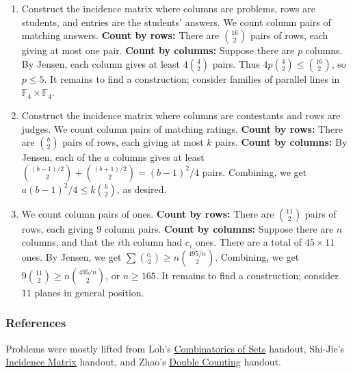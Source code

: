 \documentclass[11pt,paper=letter]{scrartcl}
\newcommand{\cbyrows}{{\bfseries \color{RowBlue} Count by rows: }}
\newcommand{\cbycols}{{\bfseries \color{ColOrange} Count by columns: }}
\begin{document}
\begin{enumerate}
\item Construct the incidence matrix where columns are problems, rows are students, and entries are the students' answers. We count column pairs of matching answers. \cbyrows There are $\binom{16}{2}$ pairs of rows, each giving at most one pair. \cbycols Suppose there are $p$ columns. By Jensen, each column gives at least $4\binom42$ pairs. Thus $4p\binom42 \le \binom{16}{2}$, so $p \le 5$. It remains to find a construction; consider families of parallel lines in $\mathbb{F}_4 \times \mathbb{F}_4$.

\item Construct the incidence matrix where columns are contestants and rows are judges. We count column pairs of matching ratings. \cbyrows There are $\binom b2$ pairs of rows, each giving at most $k$ pairs. \cbycols By Jensen, each of the $a$ columns gives at least $\binom{(b-1)/2}{2} + \binom{(b+1)/2}{2} = (b-1)^2/4$ pairs. Combining, we get $a(b-1)^2/4 \le k\binom b2$, as desired.

\item We count column pairs of ones. \cbyrows There are $\binom{11}{2}$ pairs of rows, each giving $9$ column pairs. \cbycols Suppose there are $n$ columns, and that the $i$th column had $c_i$ ones. There are a total of $45 \times 11$ ones. By Jensen, we get $\sum \binom{c_i}{2} \ge n\binom{495/n}{2}$. Combining, we get $9\binom{11}{2} \ge n\binom{495/n}{2}$, or $n \ge 165$. It remains to find a construction; consider $11$ planes in general position.

\end{enumerate}

\subsubsection*{References}

Problems were mostly lifted from Loh's \href{https://www.math.cmu.edu/~lohp/docs/math/mop2011/combin-sets.pdf}{Combinatorics of Sets} handout, Shi-Jie's \href{https://www.scribd.com/document/87289070/HCMOP-Open-Incidence-Matrix-Solutions}{Incidence Matrix} handout, and Zhao's \href{https://yufeizhao.com/olympiad/doublecounting_mop.pdf}{Double Counting} handout.
\end{document}
